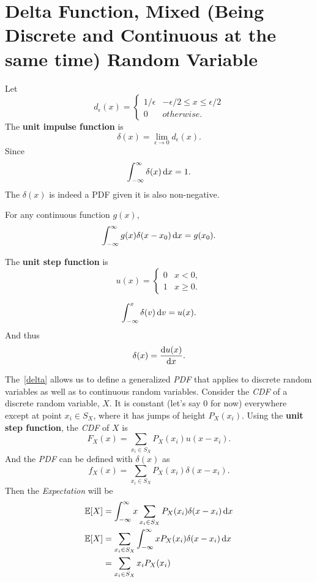 \section{Delta Function, Mixed (Being Discrete and Continuous at the same time) Random Variable}
\begin{definition}
    Let
    \[d_{\epsilon}(x)={
        \begin{cases}
            1/\epsilon & -\epsilon/2\leq x\leq \epsilon/2 \\
            0 & otherwise.
        \end{cases}
    }\]
    The \textbf{unit impulse function} is
    \[\delta(x)=\lim_{\epsilon\rightarrow 0}d_{\epsilon}(x).\]
    Since
    \[\int_{-\infty}^{\infty}\delta(x)\mathop{}\!\mathrm{d} x = 1.\]
    The $\delta(x)$ is indeed a PDF given it is also non-negative.
\end{definition}

\begin{theorem}
    For any continuous function $g(x)$,
    \[\int_{-\infty}^{\infty}g(x)\delta(x-x_0)\mathop{}\!\mathrm{d} x = g(x_0).\]
\end{theorem}

\begin{definition}
    The \textbf{unit step function} is
    \[u(x)={
        \begin{cases}
            0 & x<0, \\
            1 & x\geq 0.
        \end{cases}
    }\]
\end{definition}

\begin{theorem}\label{delta}
    \[\int_{-\infty}^{x}\delta(v)\mathop{}\!\mathrm{d} v = u(x).\]
    And thus
    \[\delta(x)=\frac{\mathop{}\!\mathrm{d} u(x)}{\mathop{}\!\mathrm{d} x}.\]
\end{theorem}

\begin{corollary}
    The~\cref{delta} allows us to define a generalized \emph{PDF} that applies to discrete random variables as well as to continuous random variables. Consider the \emph{CDF} of a discrete random variable, $X$. It is constant (let's say $0$ for now) everywhere except at point $x_i\in S_X$, where it has jumps of height $P_X(x_i)$. Using the \textbf{unit step function}, the \emph{CDF} of $X$ is
    \[F_X(x)=\sum_{x_i\in S_X} P_X(x_i)u(x-x_i).\]
    And the \emph{PDF} can be defined with $\delta(x)$ as
    \[f_X(x)=\sum_{x_i\in S_X}P_X(x_i)\delta(x-x_i).\]
    Then the \emph{Expectation} will be
    \begin{align*}
        \E{X} &= \int_{-\infty}^{\infty}x\sum_{x_i\in S_X}P_X(x_i)\delta(x-x_i)\diff x \\
        \E{X} &= \sum_{x_i\in S_X}\int_{-\infty}^{\infty}xP_X(x_i)\delta(x-x_i)\diff x \\
        &= \sum_{x_i\in S_X}x_i P_X(x_i)
    \end{align*}
\end{corollary}

